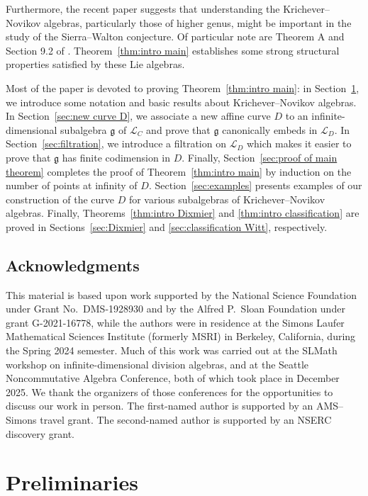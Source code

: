\documentclass[12pt]{amsart}
\theoremstyle{plain}
\theoremstyle{definition}
\numberwithin{equation}{section}
\def\g{\mathfrak{g}}
\def\L{\mathcal{L}}
\begin{document}
Furthermore, the recent paper \cite{Mathieu} suggests that understanding the Krichever--Novikov algebras, particularly those of higher genus, might be important in the study of the Sierra--Walton conjecture. Of particular note are Theorem A and Section 9.2 of \cite{Mathieu}. Theorem~\ref{thm:intro main} establishes some strong structural properties satisfied by these Lie algebras.

Most of the paper is devoted to proving Theorem~\ref{thm:intro main}: in Section~\ref{sec:prelim}, we introduce some notation and basic results about Krichever--Novikov algebras. In Section~\ref{sec:new curve D}, we associate a new affine curve $D$ to an infinite-dimensional subalgebra $\g$ of $\L_C$ and prove that $\g$ canonically embeds in $\L_D$. In Section~\ref{sec:filtration}, we introduce a filtration on $\L_D$ which makes it easier to prove that $\g$ has finite codimension in $D$. Finally, Section~\ref{sec:proof of main theorem} completes the proof of Theorem~\ref{thm:intro main} by induction on the number of points at infinity of $D$. Section~\ref{sec:examples} presents examples of our construction of the curve $D$ for various subalgebras of Krichever--Novikov algebras. Finally, Theorems~\ref{thm:intro Dixmier} and \ref{thm:intro classification} are proved in Sections~\ref{sec:Dixmier} and \ref{sec:classification Witt}, respectively.

\subsection*{Acknowledgments}

This material is based upon work supported by the National Science Foundation under Grant No.~DMS-1928930 and by the Alfred P.~Sloan Foundation under grant G-2021-16778, while the authors were in residence at the Simons Laufer Mathematical Sciences Institute (formerly MSRI) in Berkeley, California, during the Spring 2024 semester. Much of this work was carried out at the SLMath workshop on infinite-dimensional division algebras, and at the Seattle Noncommutative Algebra Conference, both of which took place in December 2025. We thank the organizers of those conferences for the opportunities to discuss our work in person. The first-named author is supported by an AMS--Simons travel grant. The second-named author is supported by an NSERC discovery grant.

\section{Preliminaries}\label{sec:prelim}
\end{document}
